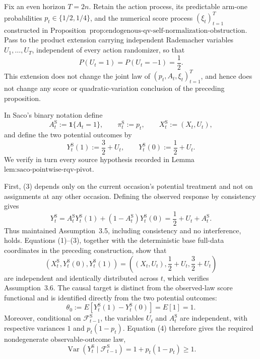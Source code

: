 Fix an even horizon \(T=2n\).  Retain the action process, its predictable arm-one probabilities \(p_t\in\{1/2,1/4\}\), and the numerical score process \((\xi_t)_{t=1}^T\) constructed in Proposition~\(\text{prop:endogenous-qv-self-normalization-obstruction}\).  Pass to the product extension carrying independent Rademacher variables \(U_1,\ldots,U_T\), independent of every action randomizer, so that
\[
 P(U_t=1)=P(U_t=-1)=\frac12.
\tag{1}
\]
This extension does not change the joint law of \((p_t,A_t,\xi_t)_{t=1}^T\), and hence does not change any score or quadratic-variation conclusion of the preceding proposition.

In Saco's binary notation define
\[
 A_t^{\mathrm S}:=\mathbf1\{A_t=1\},
 \qquad
 \pi_t^{\mathrm S}:=p_t,
 \qquad
 X_t^{\mathrm S}:=(X_t,U_t),
\tag{2}
\]
and define the two potential outcomes by
\[
 Y_t^{\mathrm S}(1):=\frac32+U_t,
 \qquad
 Y_t^{\mathrm S}(0):=\frac12+U_t.
\tag{3}
\]
We verify in turn every source hypothesis recorded in Lemma~\(\text{lem:saco-pointwise-rqv-pivot}\).

First, (3) depends only on the current occasion's potential treatment and not on assignments at any other occasion.  Defining the observed response by consistency gives
\[
 Y_t^{\mathrm S}
 =A_t^{\mathrm S}Y_t^{\mathrm S}(1)
  +(1-A_t^{\mathrm S})Y_t^{\mathrm S}(0)
 =\frac12+U_t+A_t^{\mathrm S}.
\tag{4}
\]
Thus maintained Assumption~3.5, including consistency and no interference, holds.  Equations (1)--(3), together with the deterministic base full-data coordinates in the preceding construction, show that
\[
 (X_t^{\mathrm S},Y_t^{\mathrm S}(0),Y_t^{\mathrm S}(1))
 =\left((X_t,U_t),\frac12+U_t,\frac32+U_t\right)
\tag{5}
\]
are independent and identically distributed across \(t\), which verifies Assumption~3.6.  The causal target is distinct from the observed-law score functional and is identified directly from the two potential outcomes:
\[
 \theta_0
 :=E\!\left[Y_t^{\mathrm S}(1)-Y_t^{\mathrm S}(0)\right]
 =E[1]=1.
\tag{6}
\]
Moreover, conditional on \(\mathcal F_{t-1}^{\mathrm S}\), the variables \(U_t\) and \(A_t^{\mathrm S}\) are independent, with respective variances \(1\) and \(p_t(1-p_t)\).  Equation (4) therefore gives the required nondegenerate observable-outcome law,
\[
 \operatorname{Var}(Y_t^{\mathrm S}\mid\mathcal F_{t-1}^{\mathrm S})
 =1+p_t(1-p_t)\ge1.
\tag{7}
\]

